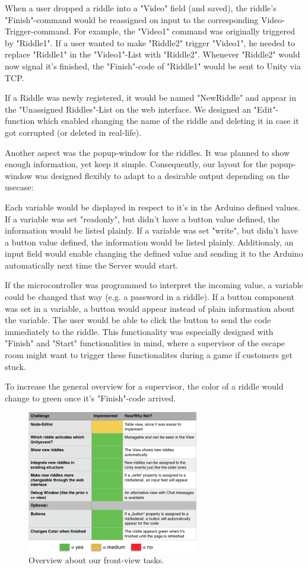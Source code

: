 When a user dropped a riddle into a "Video" field (and saved), the riddle's "Finish"-command would be reassigned on input to the corresponding Video-Trigger-command. 
For example, the "Video1" command was originally triggered by "Riddle1". 
If a user wanted to make "Riddle2" trigger "Video1", he needed to replace "Riddle1" in the "Video1"-List with "Riddle2". 
Whenever "Riddle2" would now signal it's finished, the "Finish"-code of "Riddle1" would be sent to Unity via TCP.

If a Riddle was newly registered, it would be named "NewRiddle" and appear in the "Unassigned Riddles"-List on the web interface.
We designed an "Edit"-function which enabled changing the name of the riddle and deleting it in case it got corrupted (or deleted in real-life).

Another aspect was the popup-window for the riddles. It was planned to show enough information, yet keep it simple. 
Consequently, our layout for the popup-window was designed flexibly to adapt to a desirable output depending on the usecase:

Each variable would be displayed in respect to it's in the Arduino defined values. 
If a variable was set "readonly", but didn't have a button value defined, the information would be listed plainly.
If a variable was set "write", but didn't have a button value defined, the information would be listed plainly. 
Additionaly, an input field would enable changing the defined value and sending it to the Arduino automatically next time the Server would start. 

If the microcontroller was programmed to interpret the incoming value, a variable could be changed that way (e.g. a password in a riddle).
If a button component was set in a variable, a button would appear instead of plain information about the variable. 
The user would be able to click the button to send the code immediately to the riddle. 
This functionality was especially designed with "Finish" and "Start" functionalities in mind, where a supervisor of the escape room might want to trigger these functionalites during a game if customers get stuck.

To increase the general overview for a supervisor, the color of a riddle would change to green once it's "Finish"-code arrived.

\begin{figure}[th]
	\centering
	\includegraphics[width=75mm,scale=0.75]{Figures/frontendOverview}
	\decoRule
	\caption[FrontViewTable]{Overview about our front-view tasks.}
	\label{fig:FrontViewTable}
\end{figure}



